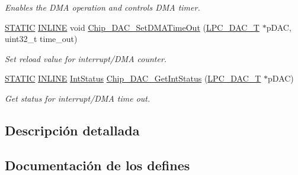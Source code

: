 \begin{DoxyCompactItemize}
\begin{DoxyCompactList}\small\item\em Enables the D\+MA operation and controls D\+MA timer. \end{DoxyCompactList}\item 
\hyperlink{group___l_p_c___types___public___macros_ga10b2d890d871e1489bb02b7e70d9bdfb}{S\+T\+A\+T\+IC} \hyperlink{spifi__18xx__43xx_8h_a2eb6f9e0395b47b8d5e3eeae4fe0c116}{I\+N\+L\+I\+NE} void \hyperlink{group___d_a_c__18_x_x__43_x_x_ga25d6e27e6b906dc2062257175697b438}{Chip\+\_\+\+D\+A\+C\+\_\+\+Set\+D\+M\+A\+Time\+Out} (\hyperlink{struct_l_p_c___d_a_c___t}{L\+P\+C\+\_\+\+D\+A\+C\+\_\+T} $\ast$p\+D\+AC, uint32\+\_\+t time\+\_\+out)
\begin{DoxyCompactList}\small\item\em Set reload value for interrupt/\+D\+MA counter. \end{DoxyCompactList}\item 
\hyperlink{group___l_p_c___types___public___macros_ga10b2d890d871e1489bb02b7e70d9bdfb}{S\+T\+A\+T\+IC} \hyperlink{spifi__18xx__43xx_8h_a2eb6f9e0395b47b8d5e3eeae4fe0c116}{I\+N\+L\+I\+NE} \hyperlink{group___l_p_c___types___public___types_gab7d263072f745b4f3913fb0afc434c4e}{Int\+Status} \hyperlink{group___d_a_c__18_x_x__43_x_x_ga22cbef1d579da4780f4fb330107eb7cb}{Chip\+\_\+\+D\+A\+C\+\_\+\+Get\+Int\+Status} (\hyperlink{struct_l_p_c___d_a_c___t}{L\+P\+C\+\_\+\+D\+A\+C\+\_\+T} $\ast$p\+D\+AC)
\begin{DoxyCompactList}\small\item\em Get status for interrupt/\+D\+MA time out. \end{DoxyCompactList}\end{DoxyCompactItemize}


\subsection{Descripción detallada}


\subsection{Documentación de los \textquotesingle{}defines\textquotesingle{}}
